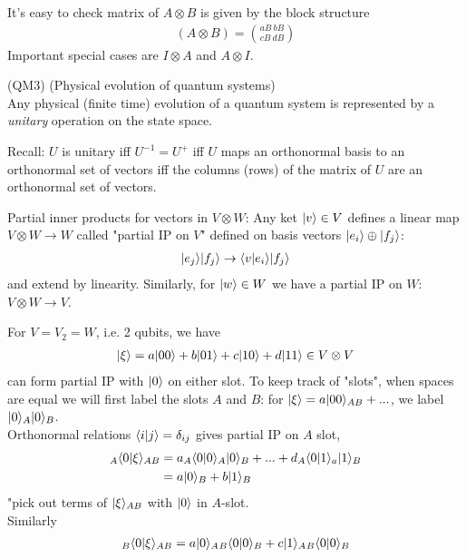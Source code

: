 \documentclass[a4paper]{article}
\begin{document}
It's easy to check matrix of $A \otimes B$ is given by the block structure
\begin{equation*}
\begin{aligned}
(A \otimes B) = {{aB \ bB} \choose {cB \ dB}}
\end{aligned}
\end{equation*}
Important special cases are $I \otimes A$ and $A \otimes I$.

(QM3) (Physical evolution of quantum systems)\\
Any physical (finite time) evolution of a quantum system is represented by a \emph{unitary} operation on the state space.

Recall: $U$ is unitary iff $U^{-1} = U^+$ iff $U$ maps an orthonormal basis to an orthonormal set of vectors iff the columns (rows) of the matrix of $U$ are an orthonormal set of vectors.

Partial inner products for vectors in $V \otimes W$: Any ket $|v\rangle \in V$ defines a linear map $V \otimes W \to W$ called "partial IP on $V$" defined on basis vectors $|e_i \rangle \oplus |f_j\rangle$:
\begin{equation*}
\begin{aligned}
|e_j \rangle |f_j \rangle \to \langle v|e_i\rangle |f_j\rangle
\end{aligned}
\end{equation*}
and extend by linearity. Similarly, for $|w\rangle \in W$ we have a partial IP on $W$: $V \otimes W \to V$.

\begin{eg}
For $V = V_2 = W$, i.e. 2 qubits, we have
\begin{equation*}
\begin{aligned}
|\xi\rangle = a|00\rangle+b|01\rangle+c|10\rangle+d|11\rangle \in V\otimes V
\end{aligned}
\end{equation*}
can form partial IP with $|0\rangle$ on either slot. To keep track of "slots", when spaces are equal we will first label the slots $A$ and $B$: for $|\xi\rangle = a|00\rangle_{AB} + ...$, we label $|0\rangle_A |0\rangle_B$.\\
Orthonormal relations $\langle i |j \rangle = \delta_{ij}$ gives partial IP on $A$ slot,
\begin{equation*}
\begin{aligned}
{}_A\langle 0|\xi\rangle_{AB} &= a{}_A\langle 0|0 \rangle_A |0\rangle_B + ... + d {}_A\langle 0|1 \rangle_a |1\rangle_B\\
&= a|0\rangle_B + b|1\rangle_B
\end{aligned}
\end{equation*}
"pick out terms of $|\xi\rangle_{AB}$ with $|0\rangle$ in $A$-slot.\\
Similarly
\begin{equation*}
\begin{aligned}
{}_B\langle 0|\xi\rangle_{AB} = a|0\rangle_A {}_B\langle 0|0\rangle_B + c|1\rangle_A {}_B \langle 0|0 \rangle_B
\end{aligned}
\end{equation*}
\end{eg}

\iffalse
\begin{equation*}
\begin{aligned}

\end{aligned}
\end{equation*}
\fi
\end{document}
